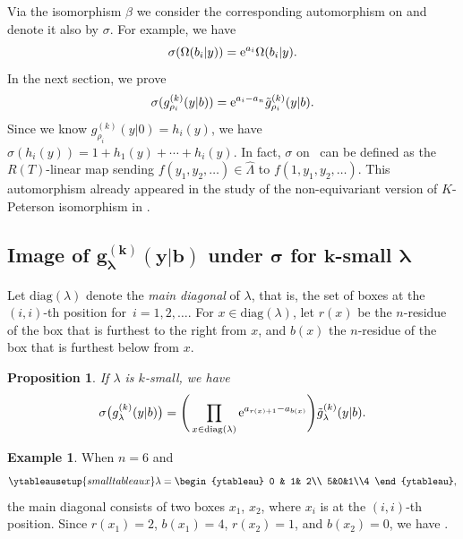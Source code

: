 \documentclass[10pt,a4paper]{amsart}
\numberwithin{equation}{section}
\newcommand{\la}{\lambda}
\newcommand{\Rep}{{R(T)}}
\newcommand{\ks}{g}
\newcommand{\kst}{\tilde{g}}
\newtheorem{Proposition}[Theorem]{Proposition}
\theoremstyle{definition}
\newtheorem{Example}[Theorem]{Example}
\begin{document}
Via the isomorphism $\beta$
we consider the corresponding automorphism on \smash{$\hat{\Lambda}_{(n)}^\Rep$}
and denote it also by $\sigma$.
For example,
we have
\begin{equation}
\sigma(\Omega(b_i|y))={\rm e}^{a_i}\Omega(b_i|y)\label{eq:sigma(Omega)}.
\end{equation}
In the next section, we prove
\begin{equation}
\sigma(\ks_{\rho_i}^{(k)}(y|b))={\rm e}^{a_i-a_n}\kst_{\rho_i}^{(k)}(y|b).\label{eq:sigma(tg)}
 \end{equation}
Since we know
$g_{\rho_i}^{(k)}(y|0)=h_i(y)$,
we have
$
\sigma(h_i(y))=1+h_1(y)+\cdots+h_i(y)$.
In fact, $\sigma$
on~\smash{$\hat{\Lambda}^\Rep$} can be defined
as the $\Rep$-linear map
sending $f(y_1,y_2,\dots)\in \hat{\Lambda}$
to $f(1,y_1,\allowbreak y_2,\dots)$.
This automorphism
already appeared in the study of the
non-equivariant version of $K$-Peterson isomorphism in
\cite{BMS,IIN}.

\subsection[Image of g\^{}(k)\_la(y|b) under sigma for k-small la]{Image of $\boldsymbol{{g}^{(k)}_\la(y|b)}$ under $\boldsymbol{\sigma}$ for $\boldsymbol{k}$-small $\boldsymbol{\la}$}

Let $\mathrm{diag}(\lambda)$ denote the \textit{main diagonal} of $\lambda$, that is, the set of boxes at the $(i,i)$-th position for~${i=1,2,\dots}$.
For $x\in \mathrm{diag}(\lambda)$, let $r(x)$ be the $n$-residue of the box that is furthest to the right from $x$, and $b(x)$ the $n$-residue of the box that is furthest below from $x$.
\begin{Proposition}\label{prop:v1_of_kKShur}
If $\lambda$ is $k$-small, we have
\[
\sigma\bigl(g^{(k)}_\lambda(y|b)\bigr)
=
\Bigg(\prod_{x\in \mathrm{diag}(\lambda)}{\rm e}^{a_{r(x)+1}-a_{b(x)}}\Bigg)
\tilde{g}^{(k)}_\lambda(y|b).\]
\end{Proposition}

\begin{Example}
When $n=6$ and
\[
\ytableausetup{smalltableaux}\lambda=
 \begin{ytableau}
 0 & 1& 2\\ 5&0&1\\4
 \end{ytableau}
 ,
 \]
the main diagonal consists of two boxes $x_1$, $x_2$, where $x_i$ is at the $(i,i)$-th position.
Since
$r(x_1)=2$,
$b(x_1)=4$,
$r(x_2)=1$, and
$b(x_2)=0$,
we have .
\end{Example}
\end{document}
